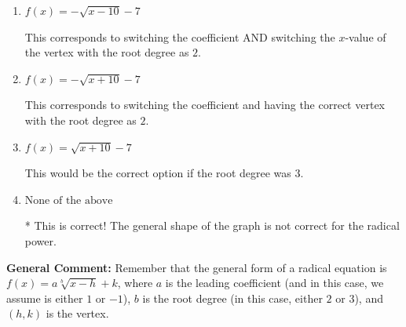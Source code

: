 \documentclass{extbook}[14pt]
\begin{document}
\begin{enumerate}
{\begin{enumerate}[label=\Alph*.]
This corresponds to the correct coefficient and switching the $x$-value of the vertex with the root degree as $2$.
\item \( f(x) = - \sqrt{x - 10} - 7 \)

This corresponds to switching the coefficient AND switching the $x$-value of the vertex with the root degree as $2$.
\item \( f(x) = - \sqrt{x + 10} - 7 \)

This corresponds to switching the coefficient and having the correct vertex with the root degree as $2$.
\item \( f(x) = \sqrt{x + 10} - 7 \)

This would be the correct option if the root degree was $3$.
\item \( \text{None of the above} \)

* This is correct! The general shape of the graph is not correct for the radical power.
\end{enumerate}

\textbf{General Comment:} Remember that the general form of a radical equation is $ f(x) = a \sqrt[b]{x - h} + k$, where $a$ is the leading coefficient (and in this case, we assume is either $1$ or $-1$), $b$ is the root degree (in this case, either $2$ or $3$), and $(h, k)$ is the vertex.
}
\end{enumerate}
\end{document}
